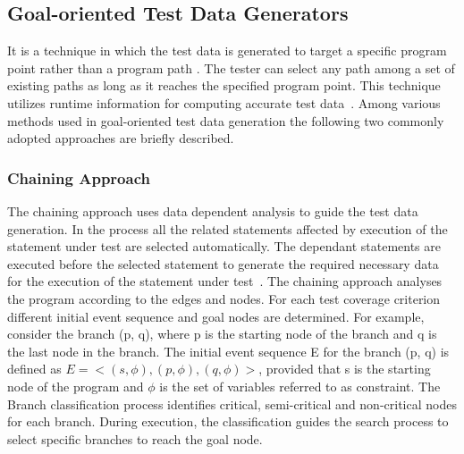 

\subsection{Goal-oriented Test Data Generators}
\label{sec:goaloriented_2}
It is a technique in which the test data is generated to target a specific program point rather than a program path \cite{chungautomated}. The tester can select any path among a set of existing paths as long as it reaches the specified program point. This technique utilizes runtime information for computing accurate test data~\cite{ferguson1996chaining}. Among various methods used in goal-oriented test data generation the following two commonly adopted approaches are briefly described.

\subsubsection{Chaining Approach}
The chaining approach uses data dependent analysis to guide the test data generation. In the process all the related statements affected by execution of the statement under test are selected automatically. The dependant statements are executed before the selected statement to generate the required necessary data for the execution of the statement under test~\cite{ferguson1996chaining}. The chaining approach analyses the program according to the edges and nodes. For each test coverage criterion different initial event sequence and goal nodes are determined. For example, consider  the branch (p, q), where p is  the starting node of the branch and q is the last node in the branch. The initial event sequence E for the branch (p, q) is defined as $E =< (s,\phi), (p,\phi),(q,\phi) >$, provided that s is the starting node of the program and $\phi$ is the set of variables referred to as constraint. The Branch classification process identifies critical, semi-critical and non-critical nodes for each branch. During execution, the classification guides the search process to select specific branches to reach the goal node.  


